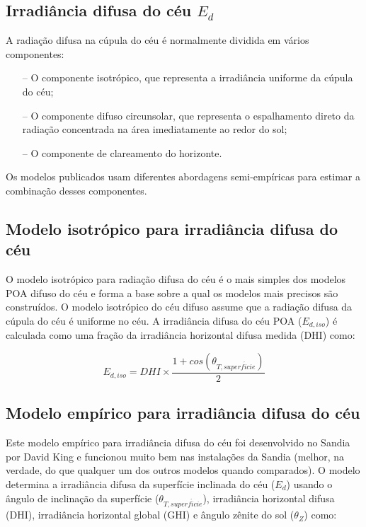\subsection{Irradiância difusa do céu $E_d$ }

A radiação difusa na cúpula do céu é normalmente dividida em vários componentes:

\begin{itemize}
  \item[--] O componente isotrópico, que representa a irradiância uniforme da cúpula do céu;
  
  \item[--] O componente difuso circunsolar, que representa o espalhamento direto da radiação concentrada na área imediatamente ao redor do sol;
  
  \item[--] O componente de clareamento do horizonte.
  
\end{itemize}

Os modelos publicados usam diferentes abordagens semi-empíricas para estimar a combinação desses componentes.

\subsection{Modelo isotrópico para irradiância difusa do céu}

O modelo isotrópico para radiação difusa do céu é o mais simples dos modelos POA difuso do céu e forma a base sobre a qual os modelos mais precisos são construídos. O modelo isotrópico do céu difuso assume que a radiação difusa da cúpula do céu é uniforme no céu. A irradiância difusa do céu POA ($E_{d,iso}$) é calculada como uma fração da irradiância horizontal difusa medida (DHI) como:

\begin{equation}
    E_{d,iso} = DHI \times \frac{1 + cos(\theta_{T, superf\acute{i}cie})}{2}
    \label{eq:ed_iso}
\end{equation}

\subsection{Modelo empírico para irradiância difusa do céu}

Este modelo empírico para irradiância difusa do céu foi desenvolvido no Sandia por David King e funcionou muito bem nas instalações da Sandia (melhor, na verdade, do que qualquer um dos outros modelos quando comparados). O modelo determina a irradiância difusa da superfície inclinada do céu ($E_d$) usando o ângulo de inclinação da superfície ($\theta_{T, superf\acute{i}cie}$), irradiância horizontal difusa (DHI), irradiância horizontal global (GHI) e ângulo zênite do sol ($\theta_Z$) como:

